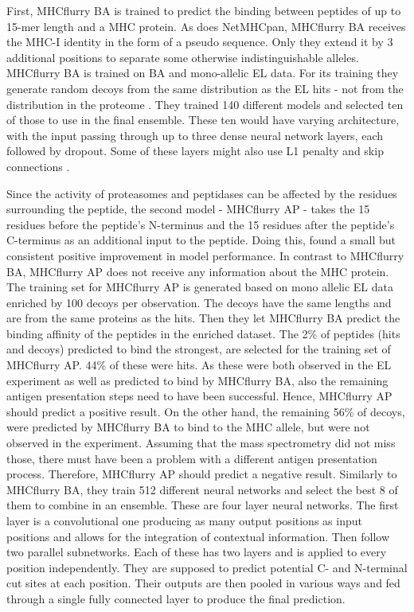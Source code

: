 \documentclass[msc,deptreport,ai]{infthesis} %
\begin{document}
	First, MHCflurry BA is trained to predict the binding between peptides of up to 15-mer length and a \gls{MHC} protein. As does NetMHCpan, MHCflurry BA receives the \gls{MHC-I} identity in the form of a pseudo sequence. Only they extend it by 3 additional positions to separate some otherwise indistinguishable alleles. MHCflurry BA is trained on \gls{BA} and mono-allelic \gls{EL} data. For its training they generate random decoys from the same distribution as the \gls{EL} hits - not from the distribution in the proteome \cite{odonnell_mhcflurry_2020}. They trained 140 different models and selected ten of those to use in the final ensemble. These ten would have varying architecture, with the input passing through up to three dense neural network layers, each followed by dropout. Some of these layers might also use L1 penalty and skip connections \cite{odonnell_mhcflurry_2020}.
	
	Since the activity of proteasomes and peptidases can be affected by the residues surrounding the peptide, the second model - MHCflurry AP - takes the 15 residues before the  peptide's N-terminus and the 15 residues after the peptide's C-terminus as an additional input to the peptide. Doing this, \cite{odonnell_mhcflurry_2020} found a small but consistent positive improvement in model performance. In contrast to MHCflurry BA, MHCflurry AP does not receive any information about the \gls{MHC} protein. The training set for MHCflurry AP is generated based on mono allelic \gls{EL} data enriched by 100 decoys per observation. The decoys have the same lengths and are from the same proteins as the hits. Then they let MHCflurry BA predict the binding affinity of the peptides in the enriched dataset. The 2\% of peptides (hits and decoys) predicted to bind the strongest, are selected for the training set of MHCflurry AP. 44\% of these were hits. As these were both observed in the \gls{EL} experiment as well as predicted to bind by MHCflurry BA, also the remaining antigen presentation steps need to have been successful. Hence, MHCflurry AP should predict a positive result.  On the other  hand, the remaining 56\% of decoys, were predicted by MHCflurry BA to bind to the \gls{MHC} allele, but were not observed in the experiment. Assuming that the mass spectrometry did not miss those, there must have been a problem with a different antigen presentation process. Therefore, MHCflurry AP should predict a negative result. Similarly to MHCflurry BA, they train 512 different neural networks and select the best 8 of them to combine in an ensemble. These are four layer neural networks. The first layer is a convolutional one producing as many output positions as input positions and allows for the integration of contextual information.  Then follow two parallel subnetworks. Each of these has two layers and is applied to  every position independently. They are supposed to predict potential C- and N-terminal cut  sites at each position. Their outputs are then pooled in various ways and fed through a single fully connected layer to produce the final prediction. \cite{odonnell_mhcflurry_2020}
	
\end{document}
